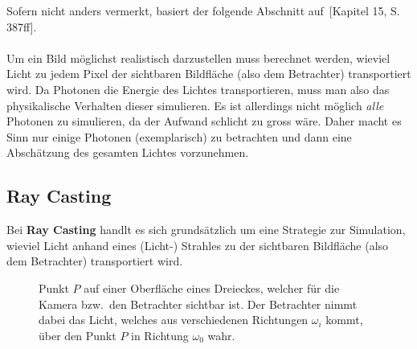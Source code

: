 
Sofern nicht anders vermerkt, basiert der folgende Abschnitt
auf~\cite{hughes_computer_2013}[Kapitel 15, S. 387ff].\\
\\
Um ein Bild möglichst realistisch darzustellen muss berechnet werden, wieviel
Licht zu jedem Pixel der sichtbaren Bildfläche (also dem Betrachter)
transportiert wird. Da Photonen die Energie des Lichtes transportieren, muss
man also das physikalische Verhalten dieser simulieren. Es ist allerdings nicht
möglich \textit{alle} Photonen zu simulieren, da der Aufwand schlicht zu gross
wäre. Daher macht es Sinn nur einige Photonen (exemplarisch) zu betrachten und
dann eine Abschätzung des gesamten Lichtes vorzunehmen.\\

\subsection{Ray Casting}
\label{subsec:ray_casting}

Bei \textbf{Ray Casting} handlt es sich grundsätzlich um eine Strategie zur
Simulation, wieviel Licht anhand eines (Licht-) Strahles zu der sichtbaren
Bildfläche (also dem Betrachter) transportiert wird.

\begin{figure}[H]
    \centering {}
    \caption{Punkt $P$ auf einer Oberfläche eines Dreieckes, welcher für die Kamera bzw.\ den Betrachter sichtbar ist.
        Der Betrachter nimmt dabei das Licht, welches aus verschiedenen Richtungen $\omega_{i}$ kommt, über den Punkt $P$ in Richtung $\omega_{0}$ wahr.\label{fig:ray_casting:basics}\protect\footnotemark}
\end{figure}

